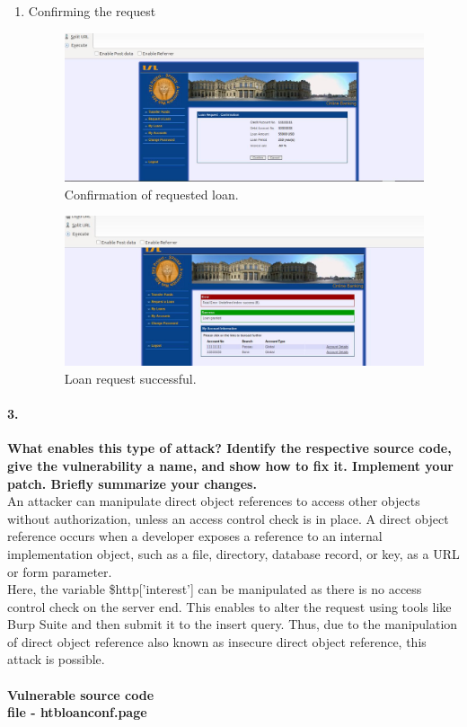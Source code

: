 \documentclass[12pt]{report}
\begin{document}
\begin{enumerate}
\begin{figure}[H]
		\end{figure}
		\item Confirming the request
		\begin{figure}[H]
			\includegraphics[width=0.75\textheight]{images/1_2confirmation.jpg}
			\caption{Confirmation of requested loan.}
			
		\end{figure}
		\begin{figure}[H]
			\includegraphics[width=0.75\textheight]{images/1_2success.jpg}
			\caption{Loan request successful.}
			
		\end{figure}
		
	\end{enumerate}
	
	
	\paragraph*{3.}{\bf What enables this type of attack? Identify the respective source code, give the vulnerability a name, and show how to fix it. Implement your patch. Briefly summarize your changes.}\\
	An attacker can manipulate direct object references to access other objects without authorization, unless an access control check is in place. A direct object reference occurs when a developer exposes a reference to an internal implementation object, such as a file, directory, database record, or key, as a URL or form parameter.\\
	Here, the variable \$http['interest'] can be manipulated as there is no access control check on the server end. This enables to alter the request using tools like Burp Suite and then submit it to the insert query. Thus, due to the manipulation of direct object reference also known as insecure direct object reference, this attack is possible.\\\\
	{\bf Vulnerable source code\\ 
		file - htbloanconf.page}
	
\end{document}
